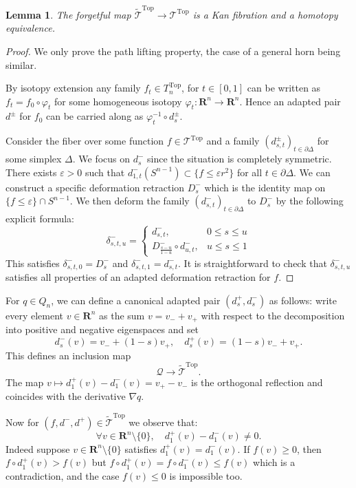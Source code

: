 \documentclass[reqno]{amsart}
\renewcommand{\epsilon}{\varepsilon}
\theoremstyle{theorem}
\newtheorem{lemma}[corollary]{Lemma}
\theoremstyle{remark}
\theoremstyle{definition}
\newcommand{\T}{\mathcal{T}}
\newcommand{\del}{\partial}
\newcommand{\R}{\mathbf{R}}
\newcommand{\TT}{\widetilde{\mathcal{T}}}
\newcommand{\QQ}{\mathcal{Q}}
\newcommand{\TOP}{\mathrm{Top}}
\begin{document}
\begin{lemma}\label{lem:adapted}
The forgetful map $\TT^\TOP \to \T^\TOP$ is a Kan fibration and a homotopy equivalence.
\end{lemma}
\begin{proof}
We only prove the path lifting property, the case of a general horn being similar. 


By isotopy extension any family $f_t\in T_n^\TOP$, for $t\in [0,1]$ can be written as $f_t=f_0\circ\varphi_t$
for some homogeneous isotopy $\varphi_t:\R^n\to \R^n$. Hence an adapted pair $d^\pm$ for $f_0$
can be carried along as $\varphi_t^{-1}\circ d_s^\pm$.


Consider the fiber over some function $f \in \T^\TOP$ and a family $(d_{s,t}^\pm)_{t\in \del \Delta}$
for some simplex $\Delta$. We focus on $d_s^-$ since the situation is completely symmetric.
There exists $\epsilon >0$ such that $d_{1,t}^-(S^{n-1}) \subset \{f\leq \epsilon r^2\}$
for all $t\in \del \Delta$.
We can construct a specific deformation retraction $D^-_s$ which is the identity map on $\{f\leq \epsilon\}\cap S^{n-1}$.
We then deform the family $(d_{s,t}^-)_{t\in \del \Delta}$ to $D_s^-$ by the following explicit formula:
\[\delta^-_{s,t,u}= \begin{cases} d^-_{s,t},& 0\leq s \leq u \\
D^-_{\frac{s-u}{1-u}}\circ d^-_{u,t},& u \leq s \leq 1\end{cases}\]
This satisfies $\delta^-_{s,t,0}=D^-_s$ and $\delta^-_{s,t,1}=d^-_{s,t}$. It is straightforward to check that $\delta^-_{s,t,u}$ satisfies all properties of an adapted deformation retraction for $f$.
\end{proof}


For $q\in Q_n$, we can define a canonical adapted pair $(d_s^+,d_s^-)$ as follows:
write every element $v\in \R^n$ as the sum $v=v_-+v_+$ with respect to the decomposition into positive and negative eigenspaces and set
\[d_s^-(v)=v_-+(1-s)v_+,\quad d_s^+(v)=(1-s)v_-+v_+.\]
This defines an inclusion map
\[\QQ\to \TT^\TOP.\]
The map $v\mapsto d_1^+(v)-d_1^-(v)=v_+-v_-$ is the orthogonal reflection and coincides with the derivative $\nabla q$.


Now for $(f,d^-,d^+)\in \TT^\TOP$ we observe that:
\[\forall v\in \R^n\setminus \{0\},\quad d_1^+(v)- d_1^-(v)\neq 0.\]
Indeed suppose $v\in \R^n\setminus\{0\}$ satisfies $d_1^+(v)=d_1^-(v)$. If $f(v)\geq 0$,
then $f\circ d_1^+(v)> f(v)$ but $f\circ d_1^+(v)=f\circ d_1^-(v)\leq f(v)$ which is a contradiction,
and the case $f(v)\leq 0$ is impossible too.
\end{document}
